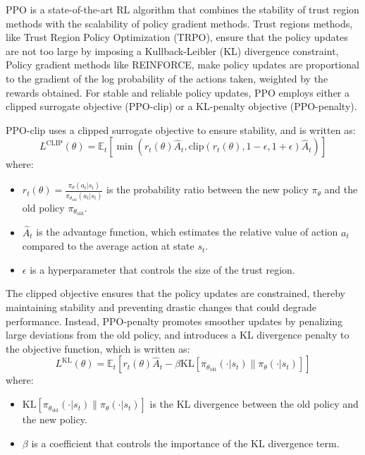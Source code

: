 \gls{PPO} is a state-of-the-art \gls{RL} algorithm that combines the stability of trust region methods with the scalability of policy gradient methods.
Trust regions methods, like Trust Region Policy Optimization (TRPO), ensure that the policy updates are not too large by imposing a Kullback-Leibler (KL) divergence constraint, 
Policy gradient methods like REINFORCE, make policy updates are proportional to the gradient of the log probability of the actions taken, weighted by the rewards obtained.
For stable and reliable policy updates, \gls{PPO} employs either a clipped surrogate objective (PPO-clip) or a KL-penalty objective (PPO-penalty).

PPO-clip uses a clipped surrogate objective to ensure stability, and is written as:
\[
L^{\text{CLIP}}(\theta) = \mathbb{E}_t \left[ \min \left( r_t(\theta) \hat{A}_t, \text{clip}(r_t(\theta), 1 - \epsilon, 1 + \epsilon) \hat{A}_t \right) \right]
\]
where:
\begin{itemize}
    \item $r_t(\theta) = \frac{\pi_{\theta}(a_t|s_t)}{\pi_{\theta_{\text{old}}}(a_t|s_t)}$ is the probability ratio between the new policy $\pi_{\theta}$ and the old policy $\pi_{\theta_{\text{old}}}$.
    \item $\hat{A}_t$ is the advantage function, which estimates the relative value of action $a_t$ compared to the average action at state $s_t$.
    \item $\epsilon$ is a hyperparameter that controls the size of the trust region.
\end{itemize}

The clipped objective ensures that the policy updates are constrained, thereby maintaining stability and preventing drastic changes that could degrade performance.
Instead, PPO-penalty promotes smoother updates by penalizing large deviations from the old policy, and introduces a KL divergence penalty to the objective function, which is written as:
\[
L^{\text{KL}}(\theta) = \mathbb{E}_t \left[ r_t(\theta) \hat{A}_t - \beta \text{KL}[\pi_{\theta_{\text{old}}}(\cdot|s_t) \| \pi_{\theta}(\cdot|s_t)] \right]
\]
where:
\begin{itemize}
    \item $\text{KL}[\pi_{\theta_{\text{old}}}(\cdot|s_t) \| \pi_{\theta}(\cdot|s_t)]$ is the KL divergence between the old policy and the new policy.
    \item $\beta$ is a coefficient that controls the importance of the KL divergence term.
\end{itemize}

